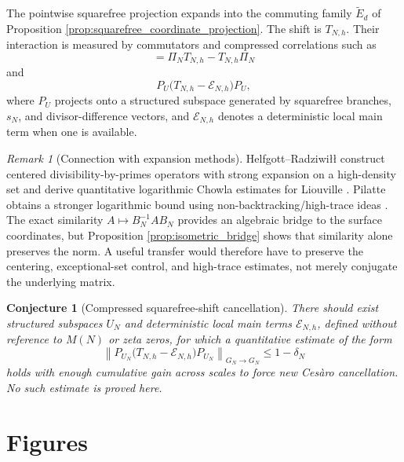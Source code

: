 \documentclass[11pt]{amsart}
\numberwithin{equation}{section}
\theoremstyle{plain}
\newtheorem{conjecture}[theorem]{Conjecture}
\theoremstyle{definition}
\theoremstyle{remark}
\newtheorem{remark}[theorem]{Remark}
\begin{document}
The pointwise squarefree projection expands into the commuting family $\widetilde E_d$ of Proposition \ref{prop:squarefree_coordinate_projection}.  The shift is $T_{N,h}$.  Their interaction is measured by commutators and compressed correlations such as
\begin{equation}
[\Pi_N,T_{N,h}]=\Pi_NT_{N,h}-T_{N,h}\Pi_N
\label{eq:squarefree_shift_commutator}
\end{equation}
and
\begin{equation}
P_U\bigl(T_{N,h}-\mathcal E_{N,h}\bigr)P_U,
\label{eq:centered_compression_template}
\end{equation}
where $P_U$ projects onto a structured subspace generated by squarefree branches, $s_N$, and divisor-difference vectors, and $\mathcal E_{N,h}$ denotes a deterministic local main term when one is available.

\begin{remark}[Connection with expansion methods]
\label{rem:expansion_methods}
Helfgott--Radziwiłł construct centered divisibility-by-primes operators with strong expansion on a high-density set and derive quantitative logarithmic Chowla estimates for Liouville \cite{HelfgottRadziwill2021}.  Pilatte obtains a stronger logarithmic bound using non-backtracking/high-trace ideas \cite{Pilatte2026}.  The exact similarity $A\mapsto B_N^{-1}AB_N$ provides an algebraic bridge to the surface coordinates, but Proposition \ref{prop:isometric_bridge} shows that similarity alone preserves the norm.  A useful transfer would therefore have to preserve the centering, exceptional-set control, and high-trace estimates, not merely conjugate the underlying matrix.
\end{remark}

\begin{conjecture}[Compressed squarefree-shift cancellation]
\label{conj:compressed_cancellation}
There should exist structured subspaces $U_N$ and deterministic local main terms $\mathcal E_{N,h}$, defined without reference to $M(N)$ or zeta zeros, for which a quantitative estimate of the form
\begin{equation}
\left\|P_{U_N}\bigl(T_{N,h}-\mathcal E_{N,h}\bigr)P_{U_N}\right\|_{G_N\to G_N}
\le 1-\delta_N
\label{eq:compressed_gap_conjecture}
\end{equation}
holds with enough cumulative gain across scales to force new Cesàro cancellation.  No such estimate is proved here.
\end{conjecture}

\section{Figures}
\label{sec:figures}
\end{document}
